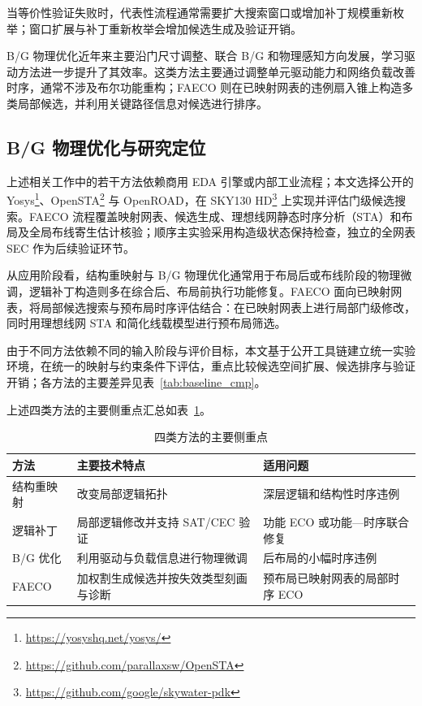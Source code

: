 \documentclass[twocolumn,10pt,fontset=windows]{ctexart}
\begin{document}
当等价性验证失败时，代表性流程通常需要扩大搜索窗口或增加补丁规模重新枚举\cite{zhuo2018patch}；窗口扩展与补丁重新枚举会增加候选生成及验证开销。

B/G 物理优化近年来主要沿门尺寸调整、联合 B/G 和物理感知方向发展\cite{liu2021rlsizer,huang2025phys,chen2024aito,zhang2025buffalo}，学习驱动方法\cite{chen2024aito,zhang2025buffalo}进一步提升了其效率。这类方法主要通过调整单元驱动能力和网络负载改善时序，通常不涉及布尔功能重构；FAECO 则在已映射网表的违例扇入锥上构造多类局部候选，并利用关键路径信息对候选进行排序。

\subsection{B/G 物理优化与研究定位}
上述相关工作中的若干方法依赖商用 EDA 引擎或内部工业流程；本文选择公开的 Yosys\footnote{\url{https://yosyshq.net/yosys/}}、OpenSTA\footnote{\url{https://github.com/parallaxsw/OpenSTA}} 与 OpenROAD\cite{openroad}，在 SKY130 HD\footnote{\url{https://github.com/google/skywater-pdk}} 上实现并评估门级候选搜索。FAECO 流程覆盖映射网表、候选生成、理想线网静态时序分析（STA）和布局及全局布线寄生估计核验；顺序主实验采用构造级状态保持检查，独立的全网表 SEC 作为后续验证环节。

从应用阶段看，结构重映射与 B/G 物理优化通常用于布局后或布线阶段的物理微调，逻辑补丁构造则多在综合后、布局前执行功能修复。FAECO 面向已映射网表，将局部候选搜索与预布局时序评估结合：在已映射网表上进行局部门级修改，同时用理想线网 STA 和简化线载模型进行预布局筛选。

由于不同方法依赖不同的输入阶段与评价目标，本文基于公开工具链建立统一实验环境，在统一的映射与约束条件下评估，重点比较候选空间扩展、候选排序与验证开销；各方法的主要差异见表~\ref{tab:baseline_cmp}。

上述四类方法的主要侧重点汇总如表~\ref{tab:related_diff}。

\begin{table}[H]
\centering
\caption{四类方法的主要侧重点}
\label{tab:related_diff}
\footnotesize
\setlength{\tabcolsep}{2pt}
\begin{tabular}{>{\raggedright\arraybackslash}p{1.55cm}>{\raggedright\arraybackslash}p{2.55cm}>{\raggedright\arraybackslash}p{3.2cm}}
\toprule
\textbf{方法} & \textbf{主要技术特点} & \textbf{适用问题} \\
\midrule
结构重映射 & 改变局部逻辑拓扑 & 深层逻辑和结构性时序违例 \\
逻辑补丁 & 局部逻辑修改并支持 SAT/CEC 验证 & 功能 ECO 或功能—时序联合修复 \\
B/G 优化 & 利用驱动与负载信息进行物理微调 & 后布局的小幅时序违例 \\
FAECO & 加权割生成候选并按失效类型刻画与诊断 & 预布局已映射网表的局部时序 ECO \\
\bottomrule
\end{tabular}
\end{table}
\end{document}
